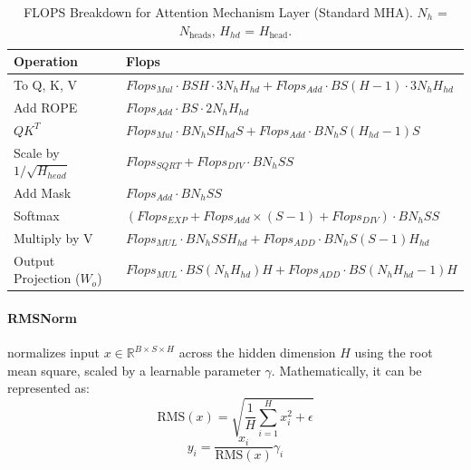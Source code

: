 \documentclass{article}
\begin{document}
\begin{table}[!th]
\renewcommand{\arraystretch}{1.4} \centering \setlength{\tabcolsep}{8pt}
\begin{tabular}{@{}ll@{}} %
    \toprule \textbf{Operation} & \textbf{Flops} \\ \midrule
    To Q, K, V & $Flops_{Mul} \cdot BSH \cdot 3 N_{h} H_{hd} + Flops_{Add} \cdot BS(H-1) \cdot 3 N_{h} H_{hd}$ \\ %
    Add ROPE & $Flops_{Add} \cdot BS \cdot 2 N_{h} H_{hd}$ \\ %
    $QK^T$ & $Flops_{Mul} \cdot B N_{h} S H_{hd} S + Flops_{Add} \cdot B N_{h} S (H_{hd}-1) S$ \\
    Scale by $1/\sqrt{H_{head}}$ & $Flops_{SQRT} + Flops_{DIV} \cdot B N_{h} S S$ \\ %
    Add Mask & $Flops_{Add} \cdot B N_{h} S S$ \\ %
    Softmax & $(Flops_{EXP} + Flops_{Add} \times (S-1) + Flops_{DIV}) \cdot B N_{h} S S$ \\ %
    Multiply by V & $Flops_{MUL} \cdot B N_{h} S S H_{hd} + Flops_{ADD} \cdot B N_{h} S (S - 1) H_{hd}$ \\
    Output Projection ($W_o$) & $Flops_{MUL} \cdot B S (N_{h} H_{hd}) H + Flops_{ADD} \cdot B S (N_{h} H_{hd} - 1) H$ \\
    \bottomrule
\end{tabular}
\caption{FLOPS Breakdown for Attention Mechanism Layer (Standard MHA). $N_h$ = $N_{\text{heads}}$, $H_{hd}$ = $H_{\text{head}}$.} %
\label{tab:attention_flops}
\end{table}

\paragraph{RMSNorm}
normalizes input $x \in \mathbb{R}^{B \times S \times H}$ across the hidden dimension $H$ using the root mean square, scaled by a learnable parameter $\gamma$. Mathematically, it can be represented as:
\begin{equation}
    \text{RMS}(x) = \sqrt{\frac{1}{H} \sum_{i=1}^{H} x_i^2 + \epsilon}
\end{equation}
\begin{equation}
    y_i = \frac{x_i}{\text{RMS}(x)} \gamma_i
\end{equation}
\end{document}
